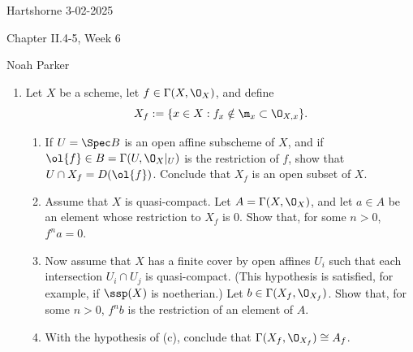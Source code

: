 \documentclass[12pt]{amsart}
\begin{document}
{Hartshorne} \hfill {3-02-2025}

\bigskip\bigskip

\begin{center}

{\sc Chapter II.4-5, Week 6}

\end{center}

\begin{center}

  {Noah Parker} %
    
\end{center}

\bigskip\bigskip

\begin{enumerate}
  \item[2.16.] {
      Let $X$ be a scheme, let $f\in \Gamma(X,\O_X)$, and define 
      \[
        X_f:=\{x\in X: f_x\notin \m_x\subset \O_{X,x}\}.
      \]
      \begin{enumerate}
        \item If $U=\Spec B$ is an open affine subscheme of $X$, and if $\ol{f}\in B=\Gamma(U,\O_X|_U)$ is the restriction of $f$, show that $U\cap X_f=D(\ol{f})$.
          Conclude that $X_f$ is an open subset of $X$.
        \item Assume that $X$ is quasi-compact. Let $A=\Gamma(X,\O_X)$, and let $a\in A$ be an element whose restriction to $X_f$ is $0$.
          Show that, for some $n>0$, $f^na=0$.
        \item Now assume that $X$ has a finite cover by open affines $U_i$ such that each intersection $U_i\cap U_j$ is quasi-compact. 
          (This hypothesis is satisfied, for example, if $\ssp(X)$ is noetherian.)
          Let $b\in \Gamma(X_f,\O_{X_f})$.
          Show that, for some $n>0$, $f^nb$ is the restriction of an element of $A$.
        \item With the hypothesis of (c), conclude that $\Gamma(X_f,\O_{X_f})\cong A_f$.
      \end{enumerate}
    }
\end{enumerate}
\end{document}

